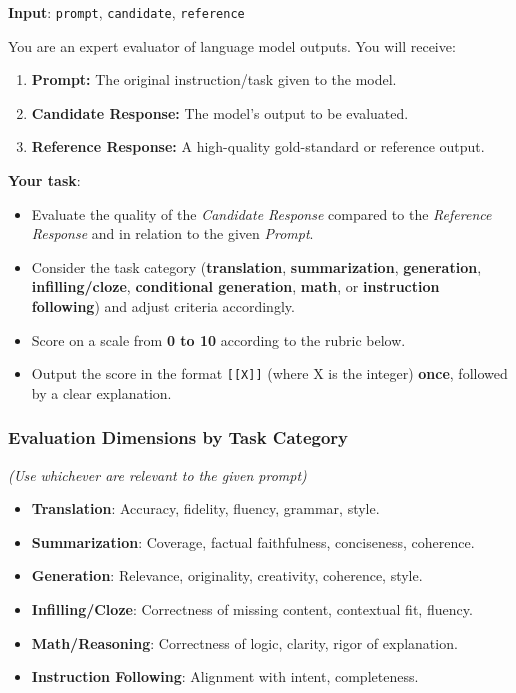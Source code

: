 \begin{tcolorbox}[
    title = {LLM-as-a-judge Prompt}, 
    breakable, 
    colframe=blue!50!black, 
    colback=blue!10,
    fonttitle=\bfseries
]
\textbf{Input}: \texttt{prompt}, \texttt{candidate}, \texttt{reference}
\tcblower

You are an expert evaluator of language model outputs. You will receive:

\begin{enumerate}
    \item \textbf{Prompt:} The original instruction/task given to the model.
    \item \textbf{Candidate Response:} The model's output to be evaluated.
    \item \textbf{Reference Response:} A high-quality gold-standard or reference output.
\end{enumerate}

\textbf{Your task}:
\begin{itemize}
    \item Evaluate the quality of the \textit{Candidate Response} compared to the \textit{Reference Response} and in relation to the given \textit{Prompt}.
    \item Consider the task category (\textbf{translation}, \textbf{summarization}, \textbf{generation}, \textbf{infilling/cloze}, \textbf{conditional generation}, \textbf{math}, or \textbf{instruction following}) and adjust criteria accordingly.
    \item Score on a scale from \textbf{0 to 10} according to the rubric below.
    \item Output the score in the format \texttt{[[X]]} (where X is the integer) \textbf{once}, followed by a clear explanation.
\end{itemize}

\tcbline %

\subsubsection*{Evaluation Dimensions by Task Category}
\textit{(Use whichever are relevant to the given prompt)}

\begin{itemize}
    \item \textbf{Translation}: Accuracy, fidelity, fluency, grammar, style.
    \item \textbf{Summarization}: Coverage, factual faithfulness, conciseness, coherence.
    \item \textbf{Generation}: Relevance, originality, creativity, coherence, style.
    \item \textbf{Infilling/Cloze}: Correctness of missing content, contextual fit, fluency.
    \item \textbf{Math/Reasoning}: Correctness of logic, clarity, rigor of explanation.
    \item \textbf{Instruction Following}: Alignment with intent, completeness.
\end{itemize}


\end{tcolorbox}

